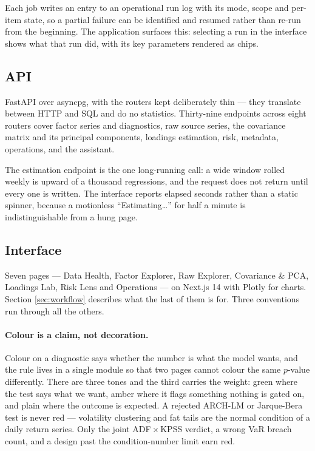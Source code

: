 \documentclass[11pt,a4paper]{article}
\begin{document}
Each job writes an entry to an operational run log with its mode, scope and per-item
state, so a partial failure can be identified and resumed rather than re-run from the
beginning. The application surfaces this: selecting a run in the interface shows what
that run did, with its key parameters rendered as chips.

\subsection{API}

FastAPI over asyncpg, with the routers kept deliberately thin --- they translate
between HTTP and SQL and do no statistics. Thirty-nine endpoints across eight routers
cover factor series and diagnostics, raw source series, the covariance matrix and its
principal components, loadings estimation, risk, metadata, operations, and the
assistant.

The estimation endpoint is the one long-running call: a wide window rolled weekly is
upward of a thousand regressions, and the request does not return until every one is
written. The interface reports elapsed seconds rather than a static spinner, because a
motionless ``Estimating\dots'' for half a minute is indistinguishable from a hung
page.

\subsection{Interface}

Seven pages --- Data Health, Factor Explorer, Raw Explorer, Covariance \& PCA,
Loadings Lab, Risk Lens and Operations --- on Next.js 14 with Plotly for charts.
Section \ref{sec:workflow} describes what the last of them is for. Three conventions
run through all the others.

\paragraph{Colour is a claim, not decoration.} Colour on a diagnostic says whether the
number is what the model wants, and the rule lives in a single module so that two
pages cannot colour the same $p$-value differently. There are three tones and the
third carries the weight: green where the test says what we want, amber where it flags
something nothing is gated on, and plain where the outcome is expected. A rejected
ARCH-LM or Jarque-Bera test is never red --- volatility clustering and fat tails are
the normal condition of a daily return series. Only the joint ADF\,$\times$\,KPSS
verdict, a wrong VaR breach count, and a design past the condition-number limit earn
red.
\end{document}
